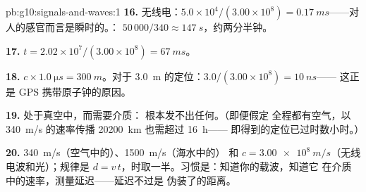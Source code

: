 \begin{solution}{pb:g10:signals-and-waves:1}
\textbf{16.} 无线电：$5.0\times10^{4}/(3.00\times10^{8}) =
\qty{0.17}{ms}$——对人的感官而言是瞬时的。：
$50\,000/340 \approx \qty{147}{s}$，约两分半钟。

\textbf{17.} $t = 2.02\times10^{7}/(3.00\times10^{8}) = \qty{67}{ms}$。

\textbf{18.} $c \times \qty{1.0}{\micro s} = \qty{300}{m}$。对于
\qty{3.0}{m} 的定位：$3.0/(3.00\times10^{8}) = \qty{10}{ns}$——
这正是 GPS 携带原子钟的原因。

\textbf{19.} 处于真空中，而需要介质：
根本发不出任何。（即便假定
全程都有空气，以 \qty{340}{m/s} 的速率传播 \qty{20200}{km} 也需超过 \qty{16}{h}——
即得到的定位已过时数小时。）

\textbf{20.} \qty{340}{m/s}（空气中的）、\qty{1500}{m/s}（海水中的）
和 $c = \qty{3.00e8}{m/s}$（无线电波和光）；规律是
$d = v\,t$，时取一半。习惯是：知道你的载波，知道它
在介质中的速率，测量延迟——延迟不过是
伪装了的距离。
\end{solution}
